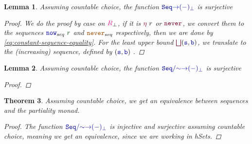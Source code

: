 \documentclass[twoside,11pt,openright]{report}
\theoremstyle{plain} %
\newtheorem{thm}{Theorem}[section]
\newtheorem{lem}[thm]{Lemma}
\theoremstyle{definition}
\theoremstyle{remark}
\newcommand*{\term}[1]{\textcolor{green!30!black}{#1}} %
\newcommand*{\type}[1]{\textcolor{magenta!90!black}{#1}}
\newcommand*{\constant}[1]{\textcolor{orange!60!black}{\ensuremath{\mathtt{#1}}}}
\newcommand*{\function}[1]{\textcolor{blue!60!black}{\ensuremath{\mathtt{#1}}}}
\newcommand*{\constructor}[1]{\textcolor{purple!60!black}{\ensuremath{\mathtt{#1}}}}
\begin{document}
\begin{lem}
  Assuming countable choice, the function \(\function{Seq{\rightarrow}(-)_\bot}\) is surjective
  \begin{proof}
    We do the proof by case  on \(\type{R}_{\bot}\), if it is \(\constructor{\eta}~r\) or \(\constructor{never}\), we convert them to the sequences \(\function{now}_{seq}~\term{r}\) and \(\constant{never}_{seq}\) respectively, then we are done by \eqref{eq:constant-sequence-equality}. For the least upper bound \(\constructor{\bigsqcup} (\function{s},\function{b})\), we translate to the (increasing) sequence, defined by \((\function{s},\function{b})\) . 
  \end{proof}
\end{lem}
\begin{lem}
  Assuming countable choice, the function \(\function{Seq/{\sim}{\rightarrow}(-)_\bot}\) is surjective
  \begin{proof}
  \end{proof}
\end{lem}
\begin{thm}
  Assuming countable choice, we get an equivalence between sequences and the partiality monad.
  \begin{proof}
 The function \(\function{Seq/{\sim}{\rightarrow}(-)_\bot}\) is injective and surjective assuming countable choice, meaning we get an equivalence, since we are working in hSets.
\end{proof}
\end{thm}

\end{document}
